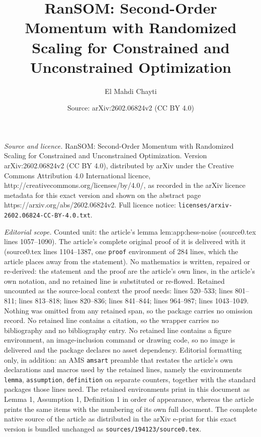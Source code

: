 \documentclass[10pt,a4paper]{amsart}
\title{RanSOM: Second-Order Momentum with Randomized Scaling for Constrained and Unconstrained Optimization}
\author{El Mahdi Chayti}
\date{Source: arXiv:2602.06824v2 (CC BY 4.0)}
\begin{document}
\maketitle

\noindent\emph{Source and licence.} RanSOM: Second-Order Momentum with Randomized Scaling for Constrained and Unconstrained Optimization. Version arXiv:2602.06824v2 (CC BY 4.0), distributed by arXiv under the Creative Commons Attribution 4.0 International licence, http://creativecommons.org/licenses/by/4.0/, as recorded in the arXiv licence metadata for this exact version and shown on the abstract page https://arxiv.org/abs/2602.06824v2. Full licence notice: \texttt{licenses/arxiv-2602.06824-CC-BY-4.0.txt}.\par\smallskip

\noindent\textit{Editorial scope.} Counted unit: the article's lemma lem:app:hess-noise (source0.tex lines 1057--1090). The article's complete original proof of it is delivered with it (source0.tex lines 1104--1387, one \texttt{proof} environment of 284 lines, which the article places away from the statement). No mathematics is written, repaired or re-derived: the statement and the proof are the article's own lines, in the article's own notation, and no retained line is substituted or re-flowed.  Retained uncounted as the source-local context the proof needs: lines 520--533; lines 801--811; lines 813--818; lines 820--836; lines 841--844; lines 964--987; lines 1043--1049.  Nothing was omitted from any retained span, so the package carries no omission record.  No retained line contains a citation, so the wrapper carries no bibliography and no bibliography entry.  No retained line contains a figure environment, an image-inclusion command or drawing code, so no image is delivered and the package declares no asset dependency.  Editorial formatting only, in addition: an AMS \texttt{amsart} preamble that restates the article's own declarations and macros used by the retained lines, namely the environments \texttt{lemma}, \texttt{assumption}, \texttt{definition} on separate counters, together with the standard packages those lines need.  The retained environments print in this document as Lemma 1, Assumption 1, Definition 1 in order of appearance, whereas the article prints the same items with the numbering of its own full document.  The complete native source of the article as distributed in the arXiv e-print for this exact version is bundled unchanged as \texttt{sources/194123/source0.tex}.
\end{document}
